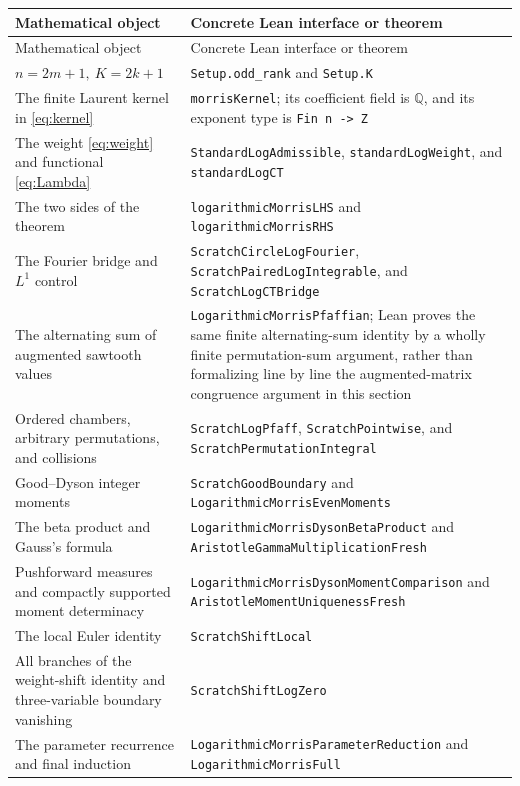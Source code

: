 \documentclass[11pt,a4paper]{article}
\theoremstyle{definition}
\begin{document}
\begin{longtable}{>{\raggedright\arraybackslash}p{}
                  >{\raggedright\arraybackslash}p{}}
\toprule
Mathematical object & Concrete Lean interface or theorem\\
\midrule
\endfirsthead
\toprule
Mathematical object & Concrete Lean interface or theorem\\
\midrule
\endhead
$n=2m+1,\ K=2k+1$ &
\texttt{Setup.odd\_rank} and \texttt{Setup.K}\\
The finite Laurent kernel in \eqref{eq:kernel} &
\texttt{morrisKernel}; its coefficient field is $\mathbb Q$, and its
exponent type is \texttt{Fin n -> Z}\\
The weight \eqref{eq:weight} and functional \eqref{eq:Lambda} &
\texttt{StandardLogAdmissible}, \texttt{standardLogWeight}, and
\texttt{standardLogCT}\\
The two sides of the theorem &
\texttt{logarithmicMorrisLHS} and \texttt{logarithmicMorrisRHS}\\
The Fourier bridge and $L^1$ control &
\texttt{ScratchCircleLogFourier},
\texttt{ScratchPairedLogIntegrable}, and
\texttt{ScratchLogCTBridge}\\
The alternating sum of augmented sawtooth values &
\texttt{LogarithmicMorrisPfaffian}; Lean proves the same finite
alternating-sum identity by a wholly finite permutation-sum argument,
rather than formalizing line by line the augmented-matrix congruence
argument in this section\\
Ordered chambers, arbitrary permutations, and collisions &
\texttt{ScratchLogPfaff}, \texttt{ScratchPointwise}, and
\texttt{ScratchPermutationIntegral}\\
Good--Dyson integer moments &
\texttt{ScratchGoodBoundary} and
\texttt{LogarithmicMorrisEvenMoments}\\
The beta product and Gauss's formula &
\texttt{LogarithmicMorrisDysonBetaProduct} and
\texttt{AristotleGammaMultiplicationFresh}\\
Pushforward measures and compactly supported moment determinacy &
\texttt{LogarithmicMorrisDysonMomentComparison} and
\texttt{AristotleMomentUniquenessFresh}\\
The local Euler identity &
\texttt{ScratchShiftLocal}\\
All branches of the weight-shift identity and three-variable boundary
vanishing &
\texttt{ScratchShiftLogZero}\\
The parameter recurrence and final induction &
\texttt{LogarithmicMorrisParameterReduction} and
\texttt{LogarithmicMorrisFull}\\
\bottomrule
\end{longtable}
\end{document}
